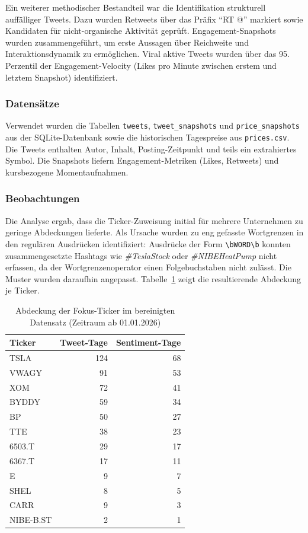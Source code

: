 Ein weiterer methodischer Bestandteil war die Identifikation strukturell auffälliger Tweets. Dazu wurden Retweets über das Präfix \enquote{RT @} markiert sowie Kandidaten für nicht-organische Aktivität geprüft. Engagement-Snapshots wurden zusammengeführt, um erste Aussagen über Reichweite und Interaktionsdynamik zu ermöglichen. Viral aktive Tweets wurden über das 95.\,Perzentil der Engagement-Velocity (Likes pro Minute zwischen erstem und letztem Snapshot) identifiziert.

\subsubsection*{Datensätze}

Verwendet wurden die Tabellen \texttt{tweets}, \texttt{tweet\_snapshots} und \texttt{price\_snapshots} aus der SQLite-Datenbank sowie die historischen Tagespreise aus \texttt{prices.csv}. Die Tweets enthalten Autor, Inhalt, Posting-Zeitpunkt und teils ein extrahiertes Symbol. Die Snapshots liefern Engagement-Metriken (Likes, Retweets) und kursbezogene Momentaufnahmen.

\subsubsection*{Beobachtungen}

Die Analyse ergab, dass die Ticker-Zuweisung initial für mehrere Unternehmen zu geringe Abdeckungen lieferte. Als Ursache wurden zu eng gefasste Wortgrenzen in den regulären Ausdrücken identifiziert: Ausdrücke der Form \texttt{\textbackslash bWORD\textbackslash b} konnten zusammengesetzte Hashtags wie \textit{\#TeslaStock} oder \textit{\#NIBEHeatPump} nicht erfassen, da der Wortgrenzenoperator einen Folgebuchstaben nicht zulässt. Die Muster wurden daraufhin angepasst. Tabelle~\ref{tab:coverage} zeigt die resultierende Abdeckung je Ticker.

\begin{table}[H]
\centering
\caption{Abdeckung der Fokus-Ticker im bereinigten Datensatz (Zeitraum ab 01.01.2026)}
\label{tab:coverage}
\begin{tabular}{lrr}
\toprule
\textbf{Ticker} & \textbf{Tweet-Tage} & \textbf{Sentiment-Tage} \\
\midrule
TSLA   & 124 & 68 \\
VWAGY  &  91 & 53 \\
XOM    &  72 & 41 \\
BYDDY  &  59 & 34 \\
BP     &  50 & 27 \\
TTE    &  38 & 23 \\
6503.T &  29 & 17 \\
6367.T &  17 & 11 \\
E      &   9 &  7 \\
SHEL   &   8 &  5 \\
CARR   &   9 &  3 \\
NIBE-B.ST &  2 &  1 \\
\bottomrule
\end{tabular}
\end{table}

